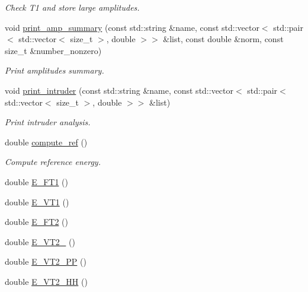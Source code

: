 \begin{DoxyCompactItemize}
\begin{DoxyCompactList}\small\item\em Check T1 and store large amplitudes. \end{DoxyCompactList}\item 
void \mbox{\hyperlink{classforte_1_1_d_s_r_g___m_r_p_t2_a45f5d2cc10218314d03e5232d3fe0cca}{print\+\_\+amp\+\_\+summary}} (const std\+::string \&name, const std\+::vector$<$ std\+::pair$<$ std\+::vector$<$ size\+\_\+t $>$, double $>$$>$ \&list, const double \&norm, const size\+\_\+t \&number\+\_\+nonzero)
\begin{DoxyCompactList}\small\item\em Print amplitudes summary. \end{DoxyCompactList}\item 
void \mbox{\hyperlink{classforte_1_1_d_s_r_g___m_r_p_t2_a47d0592d168445f748c06a0816d61d9e}{print\+\_\+intruder}} (const std\+::string \&name, const std\+::vector$<$ std\+::pair$<$ std\+::vector$<$ size\+\_\+t $>$, double $>$$>$ \&list)
\begin{DoxyCompactList}\small\item\em Print intruder analysis. \end{DoxyCompactList}\item 
double \mbox{\hyperlink{classforte_1_1_d_s_r_g___m_r_p_t2_a4500344800c525a638a373cc961952fd}{compute\+\_\+ref}} ()
\begin{DoxyCompactList}\small\item\em Compute reference energy. \end{DoxyCompactList}\item 
double \mbox{\hyperlink{classforte_1_1_d_s_r_g___m_r_p_t2_a8548c5c4e0686f3763dac78c4e315d27}{E\+\_\+\+F\+T1}} ()
\item 
double \mbox{\hyperlink{classforte_1_1_d_s_r_g___m_r_p_t2_a4ddb6a0cf716ea18138f92f2aebb0971}{E\+\_\+\+V\+T1}} ()
\item 
double \mbox{\hyperlink{classforte_1_1_d_s_r_g___m_r_p_t2_a3213f131ad783f95af808a8023945a0f}{E\+\_\+\+F\+T2}} ()
\item 
double \mbox{\hyperlink{classforte_1_1_d_s_r_g___m_r_p_t2_a96bc752be31fef42131144bd319f25eb}{E\+\_\+\+V\+T2\+\_}} ()
\item 
double \mbox{\hyperlink{classforte_1_1_d_s_r_g___m_r_p_t2_a4bbc0d52b56294bbdc99019c5820f78c}{E\+\_\+\+V\+T2\+\_\+PP}} ()
\item 
double \mbox{\hyperlink{classforte_1_1_d_s_r_g___m_r_p_t2_a8ad02257a93dbeb414872ddb4fabeb01}{E\+\_\+\+V\+T2\+\_\+HH}} ()

\end{DoxyCompactItemize}
